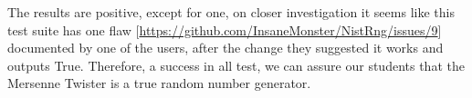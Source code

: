 The results are positive, except for one, on closer investigation it seems like this test suite has one flaw [\href{https://github.com/InsaneMonster/NistRng/issues/9}{https://github.com/InsaneMonster/NistRng/issues/9}] documented by one of the users, after the change they suggested it works and outputs True. Therefore, a success in all test, we can assure our students that the Mersenne Twister is a true random number generator.

